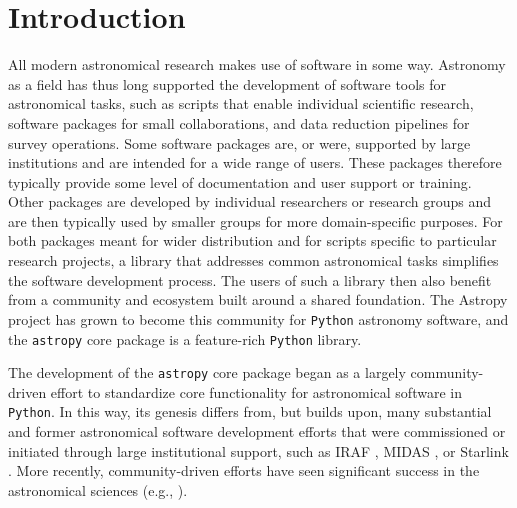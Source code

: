 \documentclass[modern]{aastex62}
\newcommand{\package}[1]{\texttt{#1}\xspace}
\newcommand{\python}{\package{Python}}
\newcommand{\astropy}{Astropy\xspace}
\newcommand{\astropypkg}{\package{astropy}}
\begin{document}
\section{Introduction} \label{sec:intro}
All modern astronomical research makes use of software in some way.
Astronomy as a field has thus long supported the development of software tools
for astronomical tasks, such as scripts that enable individual scientific
research, software packages for small collaborations, and data reduction
pipelines for survey operations.
Some software packages are, or were, supported by large institutions and are
intended for a wide range of users.
These packages therefore typically provide some level of documentation and user
support or training.
Other packages are developed by individual researchers or research groups and
are then typically used by smaller groups for more domain-specific purposes.
For both packages meant for wider distribution and for scripts specific to
particular research projects, a library that addresses common astronomical tasks
simplifies the software development process.
The users of such a library then also benefit from a community and ecosystem
built around a shared foundation.
The \astropy project has grown to become this community for \python astronomy
software, and the \astropypkg core package is a feature-rich \python library.

The development of the \astropypkg core package began as a largely
community-driven effort to standardize core functionality for astronomical
software in \python.
In this way, its genesis differs from, but builds upon, many substantial and
former astronomical software development efforts that were commissioned or
initiated through large institutional support, such as IRAF \citep[developed
at NOAO;][]{IRAF}, MIDAS \citep[developed at ESO;][]{MIDAS}, or Starlink
\citep[originally developed by a consortium of UK institutions and now
maintained by the East Asian Observatory;][]{starlink1982,starlink2013}.
More recently, community-driven efforts have seen significant success in the astronomical sciences (e.g., \citealt{yt}).
\end{document}
